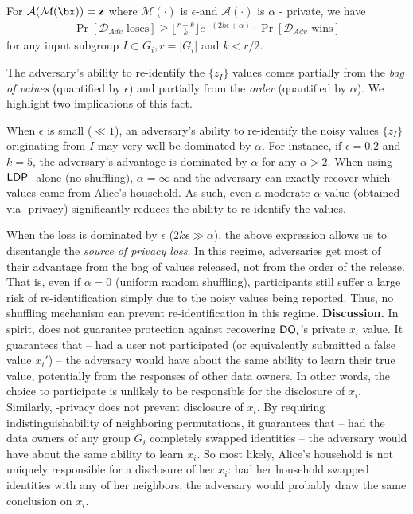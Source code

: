 \begin{thm}
\label{thm: decision theoretic}
   For $\mathcal{A}(\mathcal{M}(\bx))=\bz$ where $\mathcal{M}(\cdot)$ is $\epsilon$-\ldp and $\mathcal{A}(\cdot)$ is $\alpha$ - \name private, we have  
 \begin{align*}
     \Pr[\mathcal{D}_{Adv} \text{ loses}] \geq \big\lfloor \frac{r-k}{k} \big\rfloor e^{-(2k\epsilon+\alpha)} \cdot \Pr[\mathcal{D}_{Adv} \text{ wins}]
 \end{align*}
 for any input subgroup $I \subset G_i, r = |G_i|$ and  $k < r/2$. 
\end{thm}
\vspace{-0.3cm}
The adversary's ability to re-identify the $\{z_I\}$ values comes partially from the \textit{bag of values } (quantified by $\epsilon$) and partially from the \textit{order} (quantified by $\alpha$). We highlight two implications of this fact. 
\vspace{-0.4cm}
\squishlistfour
    \item When $\epsilon$ is small ($\ll 1$), an adversary's ability to re-identify the noisy values $\{z_I\}$ originating from $I$ may very well be dominated by $\alpha$. For instance, if $\epsilon = 0.2$ and $k = 5$, the adversary's advantage is dominated by $\alpha$ for any $\alpha > 2$. When using $\textsf{LDP}~$ alone (no shuffling), $\alpha = \infty$ and the adversary can exactly recover which values came from Alice's household. As such, even a moderate $\alpha$ value (obtained via \name-privacy) significantly reduces the ability to re-identify the values. 
    \item When the loss is dominated by $\epsilon$ ($2k \epsilon \gg \alpha$), the above expression allows us to disentangle the \textit{source of privacy loss}. In this regime, adversaries get most of their advantage from the bag of values released, not from the order of the release. That is, even if $\alpha = 0$ (uniform random shuffling), participants still suffer a large risk of re-identification simply due to the noisy values being reported. Thus, no shuffling mechanism can prevent re-identification in this regime. %
\squishendfour \vspace{-0.2cm}
\textbf{Discussion.} In spirit, \DP does not guarantee protection against recovering $\textsf{DO}_i$'s private $x_i$ value. It guarantees that -- had a user not participated (or equivalently submitted a false value $x_i'$) -- the adversary would have about the same ability to learn their true value, potentially from the responses of other data owners. In other words, the choice to participate is unlikely to be responsible for the disclosure of $x_i$. Similarly, \name-privacy does not prevent disclosure of $x_i$. By requiring indistinguishability of neighboring permutations, it guarantees that -- had the data owners of any group $G_i$ completely swapped identities -- the adversary would have about the same ability to learn $x_i$. So most likely, Alice's household is not uniquely responsible for a disclosure of her $x_i$: had her household swapped identities with any of her neighbors, the adversary would probably draw the same conclusion on $x_i$. 
